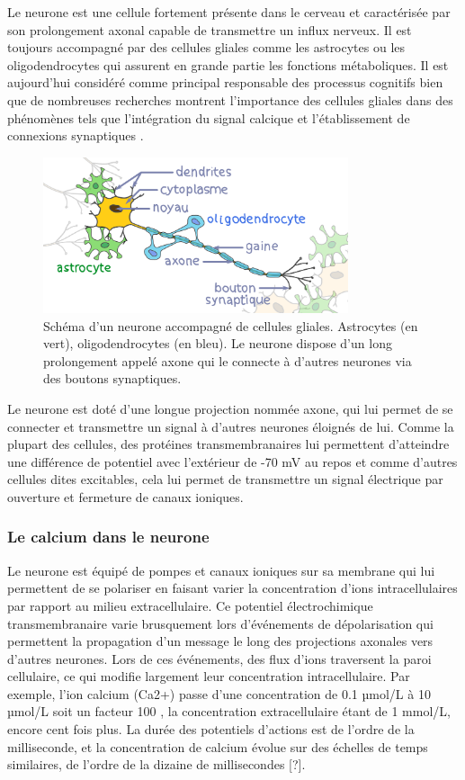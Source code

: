 Le neurone est une cellule fortement présente dans le cerveau et caractérisée par son prolongement axonal capable de transmettre un influx nerveux. Il est toujours accompagné par des cellules gliales comme les astrocytes ou les oligodendrocytes qui assurent en grande partie les fonctions métaboliques. Il est aujourd'hui considéré comme principal responsable des processus cognitifs bien que de nombreuses recherches montrent l'importance des cellules gliales dans des phénomènes tels que l'intégration du signal calcique et l'établissement de connexions synaptiques \cite{verkhratsky_calcium_1996} \cite{pfrieger_synaptic_1997}.

\begin{figure}
\centering
\includegraphics[width=0.8\textwidth]{./files/neurone.svg.png}
\caption{Schéma d'un neurone accompagné de cellules gliales. Astrocytes (en vert), oligodendrocytes (en bleu). Le neurone dispose d'un long prolongement appelé axone qui le connecte à d'autres neurones via des boutons synaptiques.}
\end{figure}

Le neurone est doté d'une longue projection nommée axone, qui lui permet de se connecter et transmettre un signal à d'autres neurones éloignés de lui. Comme la plupart des cellules, des protéines transmembranaires lui permettent d'atteindre une différence de potentiel avec l'extérieur de -70 mV au repos et comme d'autres cellules dites excitables, cela lui permet de transmettre un signal électrique par ouverture et fermeture de canaux ioniques.

\subsubsection{Le calcium dans le neurone}

Le neurone est équipé de pompes et canaux ioniques sur sa membrane qui lui permettent de se polariser en faisant varier la concentration d'ions intracellulaires par rapport au milieu extracellulaire. Ce potentiel électrochimique transmembranaire varie brusquement lors d'événements de dépolarisation qui permettent la propagation d'un message le long des projections axonales vers d'autres neurones. Lors de ces événements, des flux d'ions traversent la paroi cellulaire, ce qui modifie largement leur concentration intracellulaire. Par exemple, l'ion calcium (Ca2+) passe d'une concentration de 0.1 µmol/L à 10 µmol/L soit un facteur 100 \cite{grienberger_imaging_2012}, la concentration extracellulaire étant de 1 mmol/L, encore cent fois plus. La durée des potentiels d'actions est de l'ordre de la milliseconde, et la concentration de calcium évolue sur des échelles de temps similaires, de l'ordre de la dizaine de millisecondes [?].

